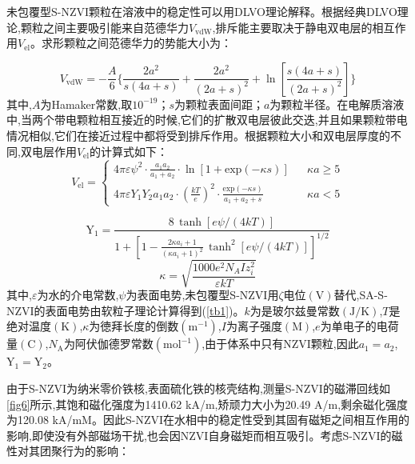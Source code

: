 未包覆型S-NZVI颗粒在溶液中的稳定性可以用DLVO理论解释\cite{gregory1981approximate,bian2011aggregation}。根据经典DLVO理论,颗粒之间主要吸引能来自范德华力$V_\mathrm{vdW}$,排斥能主要取决于静电双电层的相互作用$V_\mathrm{el}$。求形颗粒之间范德华力的势能大小为\cite{huynh2011aggregation}：

\begin{equation}
    V_{\mathrm {vdW}}=-\frac{A}{6}\{\frac{2a^2}{s(4a+s)}+\frac{2a^2}{(2a+s)^2}+\ln[\frac{s(4a+s)}{(2a+s)^2}]\}
\end{equation}
其中,$A$为Hamaker常数,取$10^{-19}$；$s$为颗粒表面间距；$a$为颗粒半径。在电解质溶液中,当两个带电颗粒相互接近的时候,它们的扩散双电层彼此交迭,并且如果颗粒带电情况相似,它们在接近过程中都将受到排斥作用。根据颗粒大小和双电层厚度的不同,双电层作用$V_{\mathrm{el}}$的计算式如下\cite{bian2011aggregation,noh2010fluorescence,OHSHIMA199545}：
\begin{equation}
    V_{\mathrm{el}}=\left\{
        \begin{array}{lcl}
            4\pi \varepsilon \psi^2\cdot\frac{a_1a_2}{a_1+a_2}\cdot\ln[1+{\mathrm {exp}}(-\kappa s)]& &{\kappa a \geqslant  5}\\
            4\pi \varepsilon Y_1Y_2a_1a_2\cdot(\frac{kT}{e})^2\cdot\frac{{\mathrm {exp}}(-\kappa s)}{a_1+a_2+s}& &{\kappa a < 5}
        \end{array}\right.
\end{equation}

\begin{equation}
    \mathrm{Y_1}=\frac{8\, \tanh[e\psi /(4kT)]}{1+[1-\frac{2\kappa a_i+1}{(\kappa a_i +1)^2} \, \tanh^2[e\psi/(4kT)]] ^{1/2}} 
\end{equation}
\begin{equation}
    \kappa =\sqrt{\frac{1000 e^2 N_A I z_i^2}{\varepsilon k T}}
\end{equation}
其中,$\varepsilon$为水的介电常数,$\psi$为表面电势,未包覆型S-NZVI用$\zeta$电位$(\mathrm V)$替代\cite{wu2013aggregation,bhardwaj2010self,feriancikova2012deposition},SA-S-NZVI的表面电势由软粒子理论计算得到(\cref{tb1})。$k$为是玻尔兹曼常数$(\mathrm {J/K})$,$T$是绝对温度$\mathrm {(K)}$,$\kappa$为徳拜长度的倒数$(\mathrm m^{-1})$,$I$为离子强度$(\mathrm M)$,$e$为单电子的电荷量$\mathrm {(C)}$,$N_\mathrm{A}$为阿伏伽德罗常数$(\mathrm {mol^{-1}})$,由于体系中只有NZVI颗粒,因此$a_1=a_2$,$\mathrm{Y_1=Y_2}$。

由于S-NZVI为纳米零价铁核,表面硫化铁的核壳结构,测量S-NZVI的磁滞回线如\cref{fig6}所示,其饱和磁化强度为1410.62 kA/m,矫顽力大小为20.49 A/m,剩余磁化强度为120.08 kA/mM。因此S-NZVI在水相中的稳定性受到其固有磁矩之间相互作用的影响,即使没有外部磁场干扰,也会因NZVI自身磁矩而相互吸引\cite{butter2003direct}。考虑S-NZVI的磁性对其团聚行为的影响：

